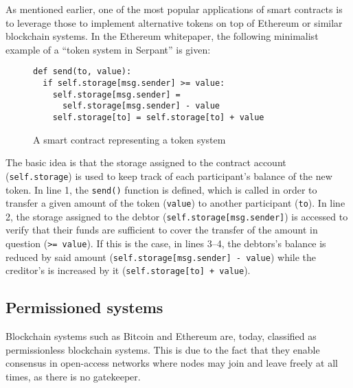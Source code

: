 As mentioned earlier, one of the most popular applications of smart contracts is to leverage those to implement alternative tokens on top of Ethereum or similar blockchain systems.
In the Ethereum whitepaper, the following minimalist example of a ``token system in Serpant'' is given: \autocite[20]{buterin2013a}
\\
\begin{figure}[H]
\centering
\begin{lstlisting}
def send(to, value):
  if self.storage[msg.sender] >= value:
    self.storage[msg.sender] =
      self.storage[msg.sender] - value
    self.storage[to] = self.storage[to] + value
\end{lstlisting}
\caption*{A smart contract representing a token system}
\end{figure}


The basic idea is that the storage assigned to the contract account (\texttt{self.storage}) is used to keep track of each participant's balance of the new token.
In line 1, the \texttt{send()} function is defined, which is called in order to transfer a given amount of the token (\texttt{value}) to another participant (\texttt{to}).
In line 2, the storage assigned to the debtor (\texttt{self.storage[msg.sender]}) is accessed to verify that their funds are sufficient to cover the transfer of the amount in question (\texttt{>= value}).
If this is the case, in lines 3--4, the debtors's balance is reduced by said amount (\texttt{self.storage[msg.sender] - value}) while the creditor's is increased by it (\texttt{self.storage[to] + value}).

\subsection{Permissioned systems}

Blockchain systems such as Bitcoin and Ethereum are, today, classified as permissionless blockchain systems.
This is due to the fact that they enable consensus in open-access networks where nodes may join and leave freely at all times, as there is no gatekeeper.

